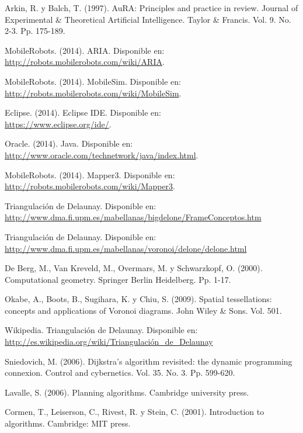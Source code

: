 \documentclass[11pt,twoside,A5]{article}
\newcommand{\link}[1]{{\footnotesize\url{#1}}}
\begin{document}
\begin{thebibliography}{999}

	Arkin, R. y Balch, T. (1997).
 	AuRA: Principles and practice in review.
	Journal of Experimental \& Theoretical Artificial Intelligence.
	Taylor \& Francis. Vol. 9. No. 2-3. Pp. 175-189.
	
	MobileRobots. (2014).
	ARIA. 	
	Disponible en: \\\link{http://robots.mobilerobots.com/wiki/ARIA}.
	
	MobileRobots. (2014).
	MobileSim. 	
	Disponible en: \\\link{http://robots.mobilerobots.com/wiki/MobileSim}.
	
	Eclipse. (2014).
	Eclipse IDE. 	
	Disponible en: \\\link{https://www.eclipse.org/ide/}.

	Oracle. (2014).
	Java. 	
	Disponible en: \\\link{http://www.oracle.com/technetwork/java/index.html}.
	
	MobileRobots. (2014).
	Mapper3. 	
	Disponible en: \\\link{http://robots.mobilerobots.com/wiki/Mapper3}.
		
	Triangulación de Delaunay. 	
	Disponible en: \\\link{http://www.dma.fi.upm.es/mabellanas/bigdelone/FrameConceptos.htm}

	Triangulación de Delaunay. 	
	Disponible en: \\\link{http://www.dma.fi.upm.es/mabellanas/voronoi/delone/delone.html}
	
	De Berg, M., Van Kreveld, M., Overmars, M. y Schwarzkopf, O. (2000). Computational geometry. Springer Berlin Heidelberg.
	Pp. 1-17.

	Okabe, A., Boots, B., Sugihara, K. y Chiu, S. (2009). Spatial tessellations: concepts and applications of Voronoi diagrams. John Wiley & Sons. Vol. 501.

	Wikipedia.
	Triangulación de Delaunay. 	
	Disponible en: \\\link{http://es.wikipedia.org/wiki/Triangulación_de_Delaunay}		
	
	Sniedovich, M. (2006). 
	Dijkstra's algorithm revisited: the dynamic programming connexion. 
	Control and cybernetics.
	Vol. 35. No. 3. Pp. 599-620.

	Lavalle, S. (2006). Planning algorithms. Cambridge university press.
	
	Cormen, T., Leiserson, C., Rivest, R. y Stein, C. (2001). Introduction to algorithms. Cambridge: MIT press.


\end{thebibliography}
\end{document}
